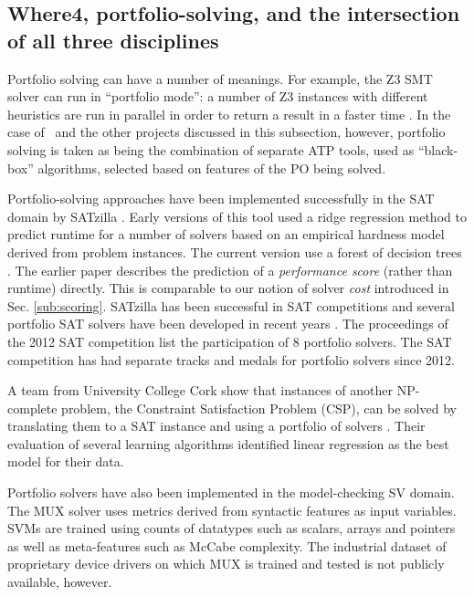 \subsection{Where4, portfolio-solving, and the intersection of all three disciplines}
\label{sub:lrsvmmml}

Portfolio solving can have a number of meanings. For example, the Z3 SMT solver can run in ``portfolio mode'': a number of Z3 instances with different heuristics are run in parallel in order to return a result in a faster time \cite{WintersteigerHM09}. In the case of \where~and the other projects discussed in this subsection, however, portfolio solving is taken as being the combination of separate ATP tools, used as ``black-box'' algorithms, selected based on features of the PO being solved.

Portfolio-solving approaches have been implemented successfully in the SAT domain by SATzilla \cite{Satzilla}. Early versions of this tool used a ridge regression method to predict runtime for a number of solvers based on an empirical hardness model derived from problem instances. The current version \cite{SATzilla2012} use a forest of decision trees . The earlier paper describes the prediction of a \textit{performance score} (rather than runtime) directly.  This is comparable to our notion of solver \textit{cost} introduced in Sec. \ref{sub:scoring}. SATzilla has been successful in SAT competitions and several portfolio SAT solvers have been developed in recent years \cite{SAT2012}.  The proceedings of the 2012 SAT competition 
list the participation of 8 portfolio solvers. The SAT competition has had separate tracks and medals for portfolio solvers since 2012.  

A team from University College Cork show that instances of another NP-complete problem, the Constraint Satisfaction Problem (CSP), can be solved by translating them to a SAT instance and using a portfolio of solvers \cite{Hurley2014}. Their evaluation of several learning algorithms identified linear regression as the best model for their data.

Portfolio solvers have also been implemented in the model-checking SV domain. The MUX \cite{MUX} solver uses metrics derived from syntactic features as input variables. SVMs are trained using counts of datatypes such as scalars, arrays and pointers as well as meta-features such as McCabe complexity. The industrial dataset of proprietary device drivers on which MUX is trained and tested is not publicly available, however.   

